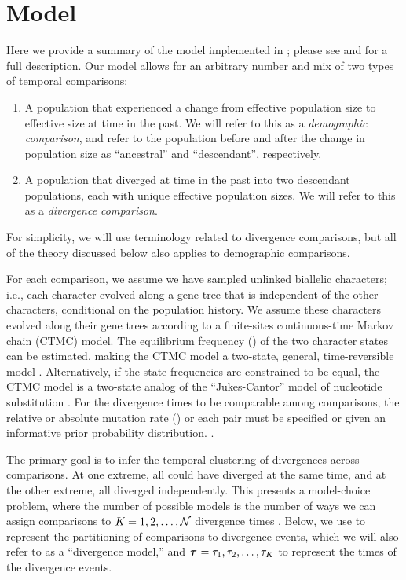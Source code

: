 \documentclass[letterpaper,12pt]{article}
\begin{document}
\section{Model}

Here we provide a summary of the model implemented in \ecoevolity; please see
\citet{Oaks2018ecoevolity} and \citet{Oaks2019codemog} for a full description.
Our model allows for an arbitrary number and mix of two types of temporal
comparisons:
\begin{enumerate}
    \item A population that experienced a change from effective population size
        \epopsize[\rootpopindex]
        to effective size
        \epopsize[\descendantpopindex{}]
        at time \comparisonetime in the past.
        We will refer to this as a \emph{demographic comparison},
        and refer to the population before and after the change in population
        size as ``ancestral'' and ``descendant'', respectively.
    \item A population that diverged at time \comparisonetime in the past into
        two descendant populations, each with unique effective population
        sizes.
        We will refer to this as a \emph{divergence comparison}.
\end{enumerate}
For simplicity, we will use terminology related to divergence comparisons, but
all of the theory discussed below also applies to demographic comparisons.

For each comparison, we assume we have sampled unlinked biallelic characters;
i.e., each character evolved along a gene tree that is independent of the
other characters, conditional on the population history.
We assume these characters evolved along their gene trees according to a
finite-sites continuous-time Markov chain (CTMC) model.
The equilibrium frequency (\gfreq) of the two character states can be
estimated, making the CTMC model a two-state, general, time-reversible model
\citep{Tavare1986}.
Alternatively, if the state frequencies are constrained to be equal, the CTMC
model is a two-state analog of the ``Jukes-Cantor'' model of nucleotide substitution
\citep{JC1969}.
For the divergence times to be comparable among comparisons, the relative or
absolute mutation rate (\murate) or each pair must be specified or given an
informative prior probability distribution.
\citep{Oaks2018ecoevolity,Oaks2019codemog}.

The primary goal is to infer the temporal clustering of divergences across
\ncomparisons comparisons.
At one extreme, all \ncomparisons could have diverged at the same time,
and at the other extreme, all \ncomparisons diverged independently.
This presents a model-choice problem, where the number of possible models
is the number of ways we can assign \ncomparisons comparisons to
$\nevents = 1, 2,  \ldots, \ncomparisons$ divergence times
\citep[the Bell number;][]{Bell1934}.
Below, we use \etimesets to represent the partitioning of comparisons to
divergence events, which we will also refer to as a ``divergence model,'' and
$\etimes = \etime[1], \etime[2], \ldots, \etime[\nevents]$
to represent the times of the \nevents divergence events.
\end{document}
